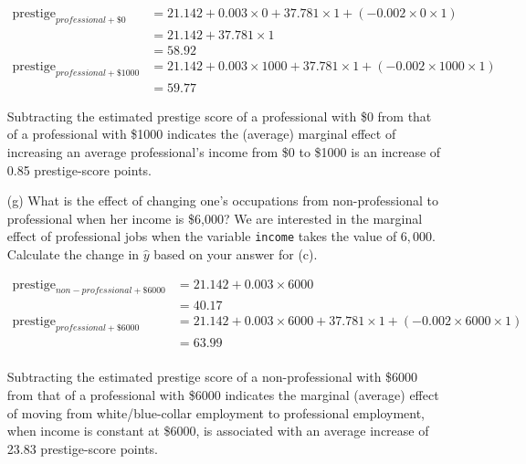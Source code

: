 \documentclass[12pt,letterpaper]{article}
\begin{document}
\begin{enumerate}
	\begin{align*}
		\text{prestige}_{professional + \$0} &= 21.142 + 0.003 \times  0 + 37.781 \times  1 + (-0.002 \times  0 \times 1)\\
		&= 21.142 + 37.781 \times  1\\
		&= 58.92\\
		\text{prestige}_{professional + \$1000} &= 21.142 + 0.003 \times  1000 + 37.781 \times  1 + (-0.002 \times  1000 \times 1)\\
		&= 59.77
	\end{align*}
	
	
	
	\noindent Subtracting the estimated prestige score of a professional with \$0 from that of a professional with \$1000 indicates the (average) marginal effect of increasing an average professional's income from \$0 to \$1000 is an increase of 0.85 prestige-score points.

	
	
	\item [(g)]
	What is the effect of changing one's occupations from non-professional to professional when her income is \$6,000? We are interested in the marginal effect of professional jobs when the variable \texttt{income} takes the value of $6,000$. Calculate the change in $\hat{y}$ based on your answer for (c).
	
	\begin{align*}
		\text{prestige}_{non-professional + \$6000} &= 21.142 + 0.003 \times  6000\\
		&= 40.17\\
		\text{prestige}_{professional + \$6000} &= 21.142 + 0.003 \times  6000 + 37.781 \times  1 + (-0.002 \times  6000 \times 1)\\
		&= 63.99\\
	\end{align*}	
	
		
	
	\noindent Subtracting the estimated prestige score of a non-professional with \$6000 from that of a professional with \$6000 indicates the marginal (average) effect of moving from white/blue-collar employment to professional employment, when income is constant at \$6000, is associated with an average increase of 23.83 prestige-score points.
	
		
	
\end{enumerate}
\end{document}
